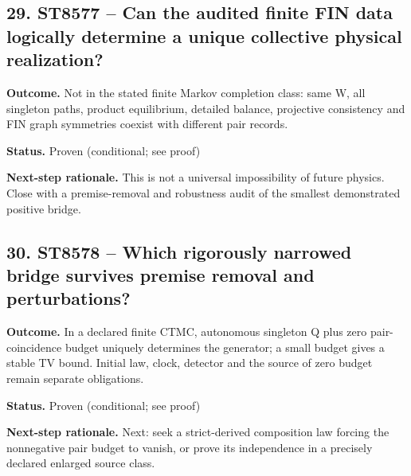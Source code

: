\subsection*{29. ST8577 -- Can the audited finite FIN data logically determine a unique collective physical realization?}
\noindent\textbf{Outcome.} Not in the stated finite Markov completion class: same W, all singleton paths, product equilibrium, detailed balance, projective consistency and FIN graph symmetries coexist with different pair records.\par
\noindent\textbf{Status.} Proven (conditional; see proof)\par
\noindent\textbf{Next-step rationale.} This is not a universal impossibility of future physics. Close with a premise-removal and robustness audit of the smallest demonstrated positive bridge.\par\medskip
\subsection*{30. ST8578 -- Which rigorously narrowed bridge survives premise removal and perturbations?}
\noindent\textbf{Outcome.} In a declared finite CTMC, autonomous singleton Q plus zero pair-coincidence budget uniquely determines the generator; a small budget gives a stable TV bound. Initial law, clock, detector and the source of zero budget remain separate obligations.\par
\noindent\textbf{Status.} Proven (conditional; see proof)\par
\noindent\textbf{Next-step rationale.} Next: seek a strict-derived composition law forcing the nonnegative pair budget to vanish, or prove its independence in a precisely declared enlarged source class.\par\medskip
